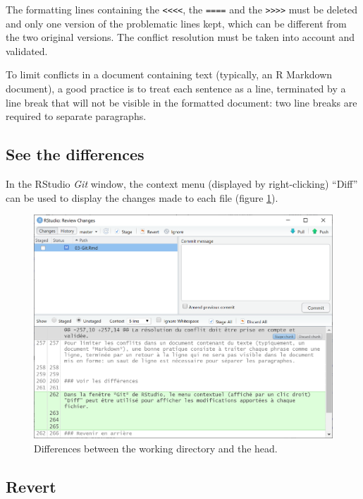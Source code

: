 \documentclass[
  12pt,
  american,
  a4paper,
  extrafontsizes,onecolumn,openright
  ]{memoir}
\begin{document}
The formatting lines containing the \texttt{\textless{}\textless{}\textless{}\textless{}}, the \texttt{====} and the \texttt{\textgreater{}\textgreater{}\textgreater{}\textgreater{}} must be deleted and only one version of the problematic lines kept, which can be different from the two original versions.
The conflict resolution must be taken into account and validated.

To limit conflicts in a document containing text (typically, an R Markdown document), a good practice is to treat each sentence as a line, terminated by a line break that will not be visible in the formatted document: two line breaks are required to separate paragraphs.

\hypertarget{see-the-differences}{%
\subsection{See the differences}\label{see-the-differences}}

In the RStudio \emph{Git} window, the context menu (displayed by right-clicking) \enquote{Diff} can be used to display the changes made to each file (figure \ref{fig:git-diff}).



\scriptsize

\begin{figure}

{\centering \includegraphics[width=0.8\linewidth]{images/git-diff} 

}

\caption{Differences between the working directory and the head.}\label{fig:git-diff}
\end{figure}

\normalsize

\hypertarget{revert}{%
\subsection{Revert}\label{revert}}
\end{document}
